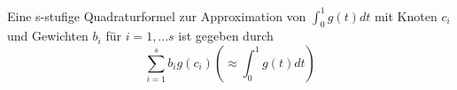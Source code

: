 \begin{definition}[Quadraturformel]
Eine s-stufige Quadraturformel zur Approximation von $\int_0^1 g(t)dt$ mit Knoten $c_i$ und Gewichten $b_i$ für $i=1,...s$ ist gegeben durch 
$$\sum_{i=1}^s b_i g(c_i) \left( \approx \int_0^1 g(t) dt\right)$$

\end{definition}

